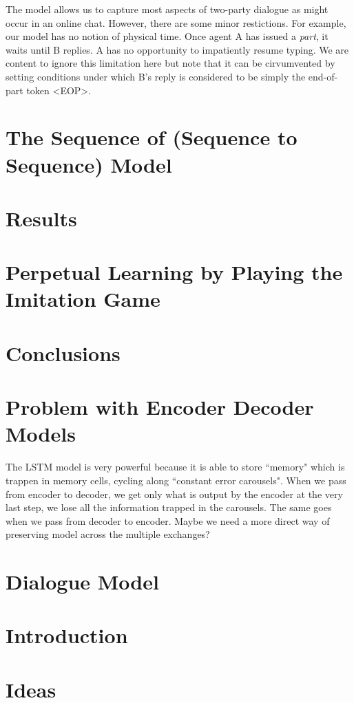\documentclass[]{article}
\begin{document}
The model allows us to capture most aspects of two-party dialogue
as might occur in an online chat.
However, there are some minor restictions.
For example, our model has no notion of physical time.
Once agent A has issued a \emph{part},
it waits until B replies.
A has no opportunity to impatiently resume typing.
We are content to ignore this limitation here but note
that it can be cirvumvented
by setting conditions under which B's reply
is considered to be simply the end-of-part token <EOP>.


\section{The Sequence of (Sequence to Sequence) Model}
\section{Results}
\section{Perpetual Learning by Playing the Imitation Game}
\section{Conclusions}


\section{Problem with Encoder Decoder Models}
The LSTM model is very powerful because it is able to store ``memory" which is trappen in memory cells, cycling along ``constant error carousels". When we pass from encoder to decoder, we get only what is output by the encoder at the very last step, we lose all the information trapped in the carousels. The same goes when we pass from decoder to encoder. Maybe we need a more direct way of preserving model across the multiple exchanges?


\section{Dialogue Model}




\section{Introduction}
\section{Ideas}
\end{document}
